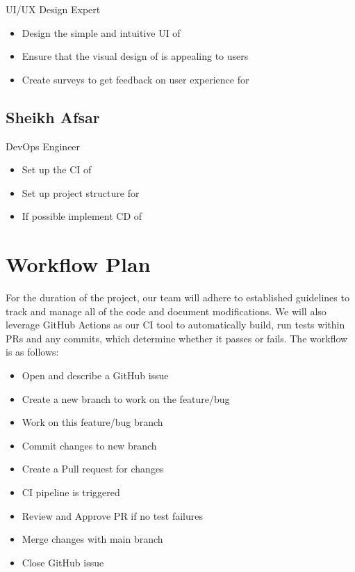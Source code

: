 \documentclass{article}
\begin{document}
UI/UX Design Expert
\begin{itemize}
    \item Design the simple and intuitive UI of \progname{}
    \item Ensure that the visual design of \progname{} is appealing to users
    \item Create surveys to get feedback on user experience for \progname{}
\end{itemize}

\subsection*{Sheikh Afsar}

DevOps Engineer
\begin{itemize}
	\item Set up the CI of \progname{}
    \item Set up project structure for \progname{}
    \item If possible implement CD of \progname{}
\end{itemize}


\section{Workflow Plan}

For the duration of the project, our team will adhere to established guidelines to track and manage all of the code and document modifications. We will also leverage GitHub Actions as our CI tool to automatically build, run tests within PRs and any commits, which determine whether it passes or fails. The workflow is as follows:
\begin{itemize}
    \item Open and describe a GitHub issue
    \item Create a new branch to work on the feature/bug
    \item Work on this feature/bug branch
    \item Commit changes to new branch
    \item Create a Pull request for changes
    \item CI pipeline is triggered
    \item Review and Approve PR if no test failures
    \item Merge changes with main branch
    \item Close GitHub issue 
\end{itemize}
\end{document}
